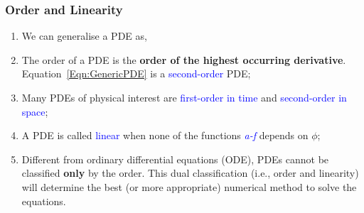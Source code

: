 \documentclass[10pt,compress,handout,ignorenonframetext]{beamer}
\begin{document}
\begin{frame}
 \frametitle{Order and Linearity}
   \begin{enumerate} 
      \item<1-> We can generalise a PDE as,
      \item<3-> The order of a PDE is the {\bf order of the highest occurring derivative}. Equation~\ref{Eqn:GenericPDE} is a \textcolor{blue}{second-order} PDE;
      \item<4-> Many PDEs of physical interest are \textcolor{blue}{first-order in time} and \textcolor{blue}{second-order in space};
      \item<5-> A PDE is called \textcolor{blue}{linear} when none of the functions \textcolor{blue}{\it a-f} depends on $\phi$; 
      \item<6-> Different from ordinary differential equations (ODE), PDEs cannot be classified {\bf only} by the order. This dual classification (i.e., order and linearity) will determine the best (or more appropriate) numerical method to solve the equations.
   \end{enumerate}
\end{frame}
\end{document}
